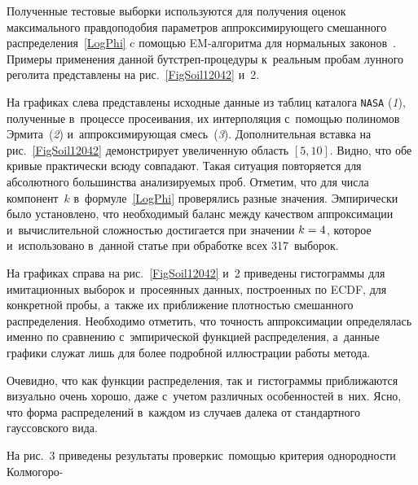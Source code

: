 \begin{multicols}{2}
Полученные тестовые выборки используются для получения оценок 
максимального правдоподобия параметров аппроксимирующего смешанного 
распределения~\eqref{LogPhi} c помощью EM-алгоритма для нормальных 
законов~\cite{Korolev2011}. Примеры применения данной 
бут\-стреп-про\-це\-ду\-ры к~реальным пробам лунного реголита представлены на 
рис.~\ref{FigSoil12042} и~2.




На графиках слева представлены исходные данные из таблиц каталога 
\verb"NASA" (\textit{1}), полученные в~процессе 
просеивания, их интерполяция с~по\-мощью полиномов Эрмита~(\textit{2}) 
и~аппроксимиру\-ющая смесь~(\textit{3}). 
Дополнительная вставка на рис.~\ref{FigSoil12042} демонстрирует 
увеличенную область $[5,10]$. Видно, что обе кривые практически всюду 
совпадают. Такая ситуация повторяется для абсолютного большинства 
анализируемых проб. Отметим, что для числа компонент~$k$ 
в~формуле~\eqref{LogPhi} проверялись разные значения. Эмпирически было 
установлено, что необходимый баланс между качеством аппроксимации 
и~вычислительной сложностью достигается при значении $k\hm=4$, которое 
и~использовано в~данной статье при обработке всех 317~выборок.




На графиках справа на рис.~\ref{FigSoil12042} и~2 
приведены гистограммы для имитационных выборок и~просеянных данных, 
построенных по ECDF, для конкретной пробы, а~также их приближение 
плотностью смешанного распределения. Необходимо отметить, что точность 
аппроксимации определялась именно по сравнению с~эмпирической функцией 
распределения, а~данные графики служат лишь для более подробной 
иллюстрации работы метода.

Очевидно, что как функции распределения, так и~гистограммы приближаются 
визуально очень хорошо, даже с~учетом различных особенностей в~них. Ясно, 
что форма распределений в~каждом из случаев далека от стандартного 
гауссовского вида.

На рис.~3 приведены результаты проверки\linebreak с~помощью критерия 
однородности Колмогоро-\linebreak\vspace*{-10pt}

\pagebreak

\end{multicols}

